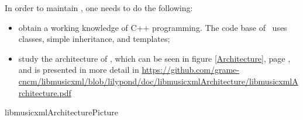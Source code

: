 In order to maintain \lib, one needs to do the following:
\begin{itemize}
\item obtain a working knowledge of C++ programming. The code base of \lib\ uses classes, simple inheritance, and templates;


\item study the architecture of \lib, which can be seen in figure \ref {Architecture}, page \pageref {Architecture}, and is presented in more detail in \url{https://github.com/grame-cncm/libmusicxml/blob/lilypond/doc/libmusicxmlArchitecture/libmusicxmlArchitecture.pdf}
\end{itemize}

{libmusicxmlArchitecturePicture}

